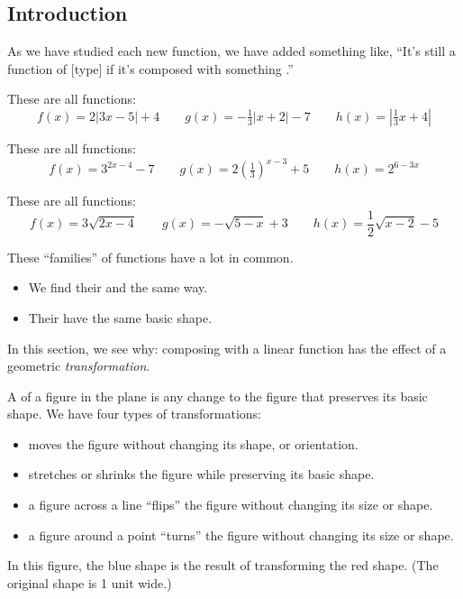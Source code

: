 \subsection{Introduction} 
As we have studied each new function, we have added something like, ``It's still a function of [type] if it's composed with something \makeblank[1in].''
\begin{Example}
These are all \makeblank functions:
\[
f(x)=2|3x-5|+4
\qquad
g(x)=-\tfrac{1}{3}|x+2|-7
\qquad
h(x)=\left|\tfrac{1}{3}x+4\right|
\]
\end{Example}
\begin{Example}
These are all \makeblank functions:
\[
f(x)=3^{2x-4}-7
\qquad
g(x)=2\left(\tfrac{1}{3}\right)^{x-3}+5
\qquad
h(x)=2^{6-3x}
\]
\end{Example}
\begin{Example}
These are all \makeblank functions:
\[
f(x)=3\sqrt{2x-4}
\qquad
g(x)=-\sqrt{5-x}+3
\qquad
h(x)=\frac{1}{2}\sqrt{x-2}-5
\]
\end{Example}
These ``families'' of functions have a lot in common.
\begin{itemize}
\item We find their \makeblank[1in] and \makeblank[1in] the same way.
\item Their \makeblank[1in] have the same basic shape.
\end{itemize}
In this section, we see why: composing with a linear function has the effect of a geometric \emph{transformation}.
\begin{definition}[Transformation]
A  of a figure in the plane is any change to the figure that preserves its basic shape. We have four types of transformations:
\begin{itemize}
\item {} moves the figure without changing its shape, or orientation.
\item {} stretches or shrinks the figure while preserving its basic shape.
\item {} a figure across a line ``flips'' the figure without changing its size or shape.
\item {} a figure around a point ``turns'' the figure without changing its size or shape.
\end{itemize}
\end{definition}
In this figure, the blue shape is the result of transforming the red shape. (The original shape is 1 unit wide.)
